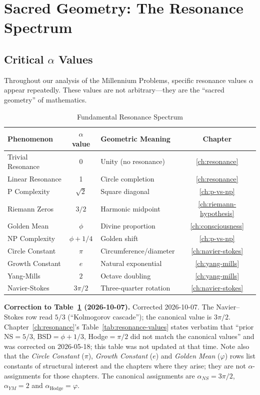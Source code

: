 \section{Sacred Geometry: The Resonance Spectrum}

\subsection{Critical \texorpdfstring{$\alpha$}{alpha} Values}

Throughout our analysis of the Millennium Problems, specific resonance values $\alpha$ appear repeatedly. These values are not arbitrary---they are the ``sacred geometry'' of mathematics.

\begin{table}[h]
\centering
\caption{Fundamental Resonance Spectrum}
\label{tab:sacred-alpha}
\begin{tabular}{|l|c|l|c|}
\hline
\textbf{Phenomenon} & \textbf{$\alpha$ value} & \textbf{Geometric Meaning} & \textbf{Chapter} \\
\hline
Trivial Resonance & 0 & Unity (no resonance) & \ref{ch:resonance} \\
Linear Resonance & 1 & Circle completion & \ref{ch:resonance} \\
P Complexity & $\sqrt{2}$ & Square diagonal & \ref{ch:p-vs-np} \\
Riemann Zeros & $3/2$ & Harmonic midpoint & \ref{ch:riemann-hypothesis} \\
Golden Mean & $\phi$ & Divine proportion & \ref{ch:consciousness} \\
NP Complexity & $\phi + 1/4$ & Golden shift & \ref{ch:p-vs-np} \\
Circle Constant & $\pi$ & Circumference/diameter & \ref{ch:navier-stokes} \\
Growth Constant & $e$ & Natural exponential & \ref{ch:yang-mills} \\
Yang-Mills & $2$ & Octave doubling & \ref{ch:yang-mills} \\
Navier-Stokes & $3\pi/2$ & Three-quarter rotation & \ref{ch:navier-stokes} \\
\hline
\end{tabular}
\end{table}

\noindent\textbf{Correction to Table~\ref{tab:sacred-alpha} (2026-10-07).} Corrected 2026-10-07. The Navier--Stokes row read $5/3$ (``Kolmogorov cascade''); the canonical value is $3\pi/2$. Chapter~\ref{ch:resonance}'s Table~\ref{tab:resonance-values} states verbatim that ``prior NS$=5/3$, BSD$=\phi+1/3$, Hodge$=\pi/2$ did not match the canonical values'' and was corrected on 2026-05-18; this table was not updated at that time. Note also that the \emph{Circle Constant} ($\pi$), \emph{Growth Constant} ($e$) and \emph{Golden Mean} ($\varphi$) rows list constants of structural interest and the chapters where they arise; they are not $\alpha$-assignments for those chapters. The canonical assignments are $\alpha_{NS} = 3\pi/2$, $\alpha_{YM} = 2$ and $\alpha_{\text{Hodge}} = \varphi$.


